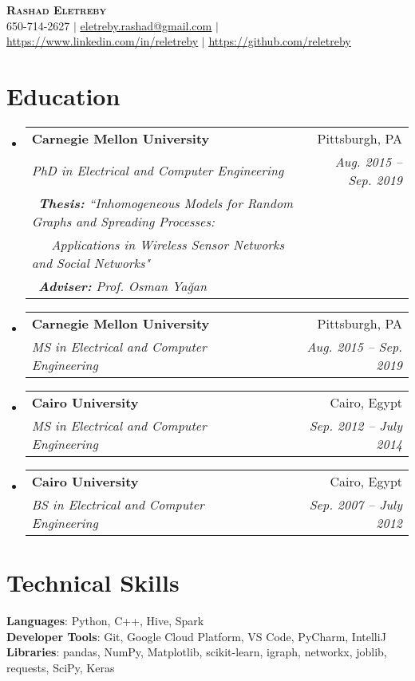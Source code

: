 \documentclass[letterpaper,11pt]{article}
\makeatletter
\newcommand{\resumeSubheading}[4]{
  \vspace{-2pt}\item
    \begin{tabular*}{0.97\textwidth}[t]{l@{\extracolsep{\fill}}r}
      \textbf{#1} & #2 \\
      \textit{\small#3} & \textit{\small #4} \\
    \end{tabular*}\vspace{-7pt}
}
\newcommand{\resumeSubheadingInfo}[7]{
  \vspace{-2pt}\item
    \begin{tabular*}{0.97\textwidth}[t]{l@{\extracolsep{\fill}}r}
      \textbf{#1} & #2 \\
      \textit{\small#3} & \textit{\small #4} \\
      \textit{\small#5} & \\
      \textit{\small#6} & \\
      \textit{\small#7} & \\
    \end{tabular*}\vspace{-7pt}
}
\newcommand{\resumeSubHeadingListStart}{\begin{itemize}[leftmargin=0.15in, label={}]}
\newcommand{\resumeSubHeadingListEnd}{\end{itemize}}
\makeatother
\begin{document}

\begin{center}
    \textbf{\Huge \scshape Rashad Eletreby} \\ \vspace{1pt}
    \small 650-714-2627 $|$ \href{mailto:eletreby.rashad@gmail.com}{\underline{eletreby.rashad@gmail.com}} $|$ 
    \href{https://www.linkedin.com/in/reletreby}{\underline{https://www.linkedin.com/in/reletreby}} $|$
    \href{https://github.com/reletreby}{\underline{https://github.com/reletreby}}
\end{center}


\section{Education}
  \resumeSubHeadingListStart
    \resumeSubheadingInfo
      {Carnegie Mellon University}{Pittsburgh, PA}
      {PhD in Electrical and Computer Engineering}{Aug. 2015 -- Sep. 2019}
      { ~{\bf{Thesis:}} ``Inhomogeneous Models for Random Graphs and Spreading Processes: }{~~~Applications in Wireless Sensor Networks and Social Networks"}
      { ~{\bf{Adviser:}} Prof. Osman Ya\u{g}an }
      
     \vspace{1mm}
    \resumeSubheading
      {Carnegie Mellon University}{Pittsburgh, PA}
      {MS in Electrical and Computer Engineering}{Aug. 2015 -- Sep. 2019}
      
       \vspace{1mm}
    \resumeSubheading
      {Cairo University}{Cairo, Egypt}
      {MS in Electrical and Computer Engineering}{Sep. 2012 -- July 2014}
      
      \vspace{1mm}
    \resumeSubheading
      {Cairo University}{Cairo, Egypt}
      {BS in Electrical and Computer Engineering}{Sep. 2007 -- July 2012}
  \resumeSubHeadingListEnd


%
\section{Technical Skills}
 \begin{itemize}[leftmargin=0.15in, label={}]
    \small{\item{
     \textbf{Languages}{: Python, C++, Hive, Spark} \\
     \textbf{Developer Tools}{: Git, Google Cloud Platform, VS Code, PyCharm, IntelliJ} \\
     \textbf{Libraries}{: pandas, NumPy, Matplotlib, scikit-learn, igraph, networkx, joblib, requests, SciPy, Keras}
    }}
 \end{itemize}
 
\end{document}

